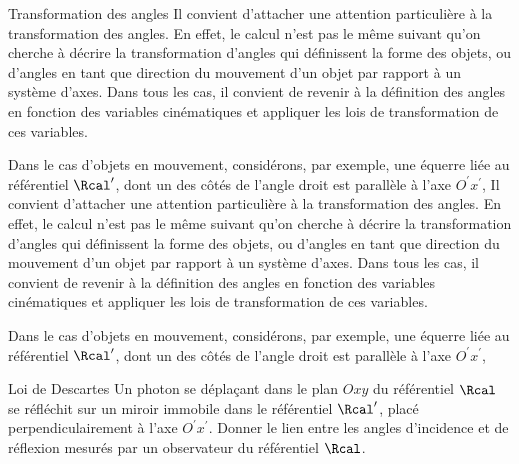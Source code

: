 \begin{exo}[PC][1][colle]{Transformation des angles}
  Il convient d'attacher une attention particulière à la transformation des angles. En effet, le calcul n'est pas le même suivant qu'on cherche à décrire la transformation d'angles qui définissent la forme des objets, ou d'angles en tant que direction du mouvement d'un objet par rapport à un système d'axes. Dans tous les cas, il convient de revenir à la définition des angles en fonction des variables cinématiques et appliquer les lois de transformation de ces variables.

Dans le cas d'objets en mouvement, considérons, par exemple, une équerre liée au référentiel $\Rcal^{\prime}$, dont un des côtés de l'angle droit est parallèle à l'axe $O^{\prime} x^{\prime}$,
Il convient d'attacher une attention particulière à la transformation des angles. En effet, le calcul n'est pas le même suivant qu'on cherche à décrire la transformation d'angles qui définissent la forme des objets, ou d'angles en tant que direction du mouvement d'un objet par rapport à un système d'axes. Dans tous les cas, il convient de revenir à la définition des angles en fonction des variables cinématiques et appliquer les lois de transformation de ces variables.

Dans le cas d'objets en mouvement, considérons, par exemple, une équerre liée au référentiel $\Rcal^{\prime}$, dont un des côtés de l'angle droit est parallèle à l'axe $O^{\prime} x^{\prime}$,
  
\end{exo}

\begin{exo}[PC][1][colle]{Loi de Descartes}
  Un photon se déplaçant dans le plan $O x y$ du référentiel $\Rcal$ se réfléchit sur un miroir immobile dans le référentiel $\Rcal^{\prime}$, placé perpendiculairement à l'axe $O^{\prime} x^{\prime}$. Donner le lien entre les angles d'incidence et de réflexion mesurés par un observateur du référentiel $\Rcal$.  
\end{exo}


